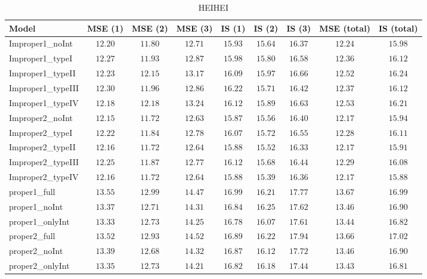 \begin{table}

\caption{\label{tab:model-choice-sc11}HEIHEI}
\centering
\begin{tabular}{lcccccccc}
\hline
Model  & MSE (1) & MSE (2) & MSE (3) & IS (1) & IS (2) & IS (3) & MSE (total) & \multicolumn{1}{c}{IS (total)} \\ 
\hline
Improper1_noInt  & $12.20$ & $11.80$ & $12.71$ & $15.93$ & $15.64$ & $16.37$ & $12.24$ & $15.98$ \\
Improper1_typeI  & $12.27$ & $11.93$ & $12.87$ & $15.98$ & $15.80$ & $16.58$ & $12.36$ & $16.12$ \\
Improper1_typeII  & $12.23$ & $12.15$ & $13.17$ & $16.09$ & $15.97$ & $16.66$ & $12.52$ & $16.24$ \\
Improper1_typeIII  & $12.30$ & $11.96$ & $12.86$ & $16.22$ & $15.71$ & $16.42$ & $12.37$ & $16.12$ \\
Improper1_typeIV  & $12.18$ & $12.18$ & $13.24$ & $16.12$ & $15.89$ & $16.63$ & $12.53$ & $16.21$ \\
Improper2_noInt  & $12.15$ & $11.72$ & $12.63$ & $15.87$ & $15.56$ & $16.40$ & $12.17$ & $15.94$ \\
Improper2_typeI  & $12.22$ & $11.84$ & $12.78$ & $16.07$ & $15.72$ & $16.55$ & $12.28$ & $16.11$ \\
Improper2_typeII  & $12.16$ & $11.72$ & $12.64$ & $15.88$ & $15.52$ & $16.33$ & $12.17$ & $15.91$ \\
Improper2_typeIII  & $12.25$ & $11.87$ & $12.77$ & $16.12$ & $15.68$ & $16.44$ & $12.29$ & $16.08$ \\
Improper2_typeIV  & $12.16$ & $11.72$ & $12.64$ & $15.88$ & $15.39$ & $16.36$ & $12.17$ & $15.88$ \\
proper1_full  & $13.55$ & $12.99$ & $14.47$ & $16.99$ & $16.21$ & $17.77$ & $13.67$ & $16.99$ \\
proper1_noInt  & $13.37$ & $12.71$ & $14.31$ & $16.84$ & $16.25$ & $17.62$ & $13.46$ & $16.90$ \\
proper1_onlyInt  & $13.33$ & $12.73$ & $14.25$ & $16.78$ & $16.07$ & $17.61$ & $13.44$ & $16.82$ \\
proper2_full  & $13.52$ & $12.93$ & $14.52$ & $16.89$ & $16.22$ & $17.94$ & $13.66$ & $17.02$ \\
proper2_noInt  & $13.39$ & $12.68$ & $14.32$ & $16.87$ & $16.12$ & $17.72$ & $13.46$ & $16.90$ \\
proper2_onlyInt  & $13.35$ & $12.73$ & $14.21$ & $16.82$ & $16.18$ & $17.44$ & $13.43$ & $16.81$ \\
\hline 
\end{tabular}


\end{table}